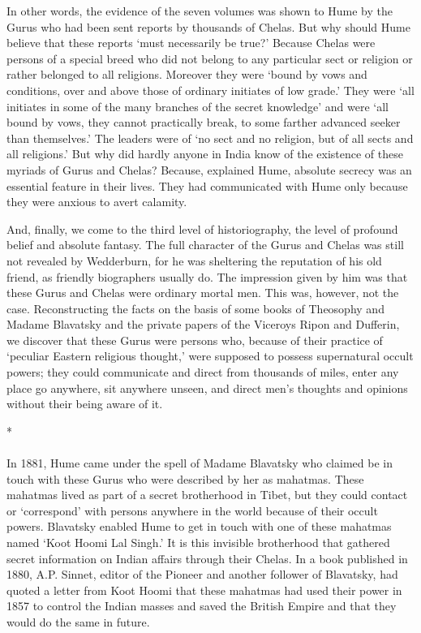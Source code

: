 \begin{multicols}{2}
In other words, the evidence of the seven volumes was shown to Hume by the Gurus who had been sent reports by thousands of Chelas. But why should Hume believe that these reports `must necessarily be true?' Because Chelas were persons of a special breed who did not belong to any particular sect or religion or rather belonged to all religions. Moreover they were `bound by vows and conditions, over and above those of ordinary initiates of low grade.' They were `all initiates in some of the many branches of the secret knowledge' and were `all bound by vows, they cannot practically break, to some farther advanced seeker than themselves.' The leaders were of `no sect and no religion, but of all sects and all religions.' But why did hardly anyone in India know of the existence of these myriads of Gurus and Chelas? Because, explained Hume, absolute secrecy was an essential feature in their lives. They had communicated with Hume only because they were anxious to avert calamity.

And, finally, we come to the third level of historiography, the level of profound belief and absolute fantasy. The full character of the Gurus and Chelas was still not revealed by Wedderburn, for he was sheltering the reputation of his old friend, as friendly biographers usually do. The impression given by him was that these Gurus and Chelas were ordinary mortal men. This was, however, not the case. Reconstructing the facts on the basis of some books of Theosophy and Madame Blavatsky and the private papers of the Viceroys Ripon and Dufferin, we discover that these Gurus were persons who, because of their practice of `peculiar Eastern religious thought,' were supposed to possess supernatural occult powers; they could communicate and direct from thousands of miles, enter any place go anywhere, sit anywhere unseen, and direct men's thoughts and opinions without their being aware of it.

\begin{center}*\end{center}

\paragraph*{}
In 1881, Hume came under the spell of Madame Blavatsky who claimed be in touch with these Gurus who were described by her as mahatmas. These mahatmas lived as part of a secret brotherhood in Tibet, but they could contact or `correspond' with persons anywhere in the world because of their occult powers. Blavatsky enabled Hume to get in touch with one of these mahatmas named `Koot Hoomi Lal Singh.' It is this invisible brotherhood that gathered secret information on Indian affairs through their Chelas. In a book published in 1880, A.P. Sinnet, editor of the Pioneer and another follower of Blavatsky, had quoted a letter from Koot Hoomi that these mahatmas had used their power in 1857 to control the Indian masses and saved the British Empire and that they would do the same in future.


\end{multicols}
